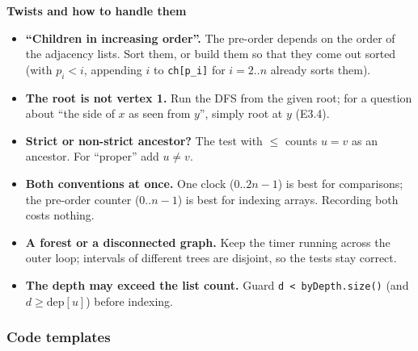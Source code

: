 \textbf{Twists and how to handle them}
\begin{itemize}[leftmargin=*]
    \item \textbf{``Children in increasing order''.} The pre-order depends on the order of the adjacency lists. Sort them, or build them so that they come out sorted (with $p_i < i$, appending $i$ to \texttt{ch[p\_i]} for $i = 2..n$ already sorts them).
    \item \textbf{The root is not vertex 1.} Run the DFS from the given root; for a question about ``the side of $x$ as seen from $y$'', simply root at $y$ (E3.4).
    \item \textbf{Strict or non-strict ancestor?} The test with $\le$ counts $u = v$ as an ancestor. For ``proper'' add $u \ne v$.
    \item \textbf{Both conventions at once.} One clock ($0..2n-1$) is best for comparisons; the pre-order counter ($0..n-1$) is best for indexing arrays. Recording both costs nothing.
    \item \textbf{A forest or a disconnected graph.} Keep the timer running across the outer loop; intervals of different trees are disjoint, so the tests stay correct.
    \item \textbf{The depth may exceed the list count.} Guard \texttt{d < byDepth.size()} (and $d \ge \mathrm{dep}[u]$) before indexing.
\end{itemize}

\subsubsection*{Code templates}

